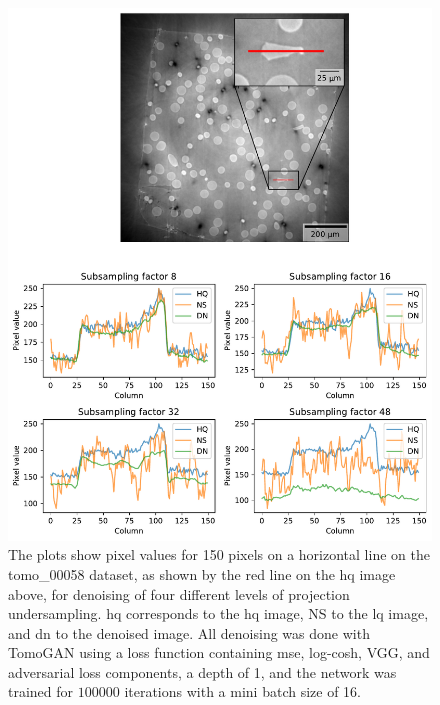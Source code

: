 \begin{figure}[htbp]
  \centering
  \includegraphics[width=.95\textwidth]{figures/differentnoiselineplot1.pdf}
  \caption[Pixel value plot of denoising of different levels of projection undersampling on tomo\_00058]{The plots show pixel values for 150 pixels on a horizontal line on the tomo\_00058 dataset, as shown by the red line on the \gls{hq} image above, for denoising of four different levels of projection undersampling. \gls{hq} corresponds to the \gls{hq} image, NS to the \gls{lq} image, and \gls{dn} to the denoised image. All denoising was done with TomoGAN using a loss function containing \gls{mse}, log-cosh, VGG, and adversarial loss components, a depth of 1, and the network was trained for $100 000$ iterations with a mini batch size of 16. }
  \label{fig:differentnoiselineplot1}
\end{figure}

